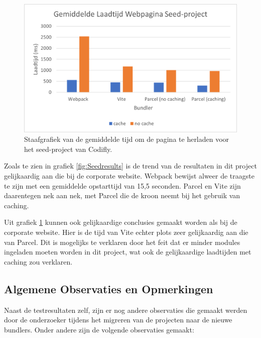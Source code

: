 \begin{figure}[!htp]
  \includegraphics[width=\linewidth]{bachproef/img/results-seed-load.png}
  \caption{Staafgrafiek van de gemiddelde tijd om de pagina te herladen voor het seed-project van Codifly.}
  \label{fig:Seedresultsloadtimes}
\end{figure}

Zoals te zien in grafiek \ref{fig:Seedresults} is de trend van de resultaten in dit project gelijkaardig aan die bij de corporate website. Webpack bewijst alweer de traagste te zijn met een gemiddelde opstarttijd van 15,5 seconden. Parcel en Vite zijn daarentegen nek aan nek, met Parcel die de kroon neemt bij het gebruik van caching.

Uit grafiek \ref{fig:Seedresultsloadtimes} kunnen ook gelijkaardige conclusies gemaakt worden als bij de corporate website. Hier is de tijd van Vite echter plots zeer gelijkaardig aan die van Parcel. Dit is mogelijks te verklaren door het feit dat er minder modules ingeladen moeten worden in dit project, wat ook de gelijkaardige laadtijden met caching zou verklaren.

\subsection{Algemene Observaties en Opmerkingen}

Naast de testresultaten zelf, zijn er nog andere observaties die gemaakt werden door de onderzoeker tijdens het migreren van de projecten naar de nieuwe bundlers. Onder andere zijn de volgende observaties gemaakt:

